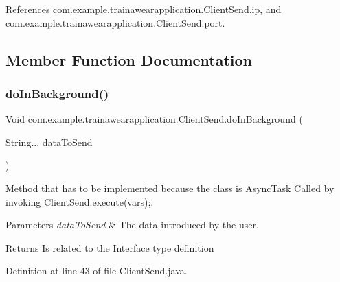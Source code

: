 References com.\+example.\+trainawearapplication.\+Client\+Send.\+ip, and com.\+example.\+trainawearapplication.\+Client\+Send.\+port.



\subsection{Member Function Documentation}
\mbox{\label{classcom_1_1example_1_1trainawearapplication_1_1_client_send_ad8e0bcd2078b23e83c1060065834ae7d}} 
\subsubsection{\texorpdfstring{doInBackground()}{doInBackground()}}
{\footnotesize\ttfamily Void com.\+example.\+trainawearapplication.\+Client\+Send.\+do\+In\+Background (\begin{DoxyParamCaption}\item[{String...}]{data\+To\+Send }\end{DoxyParamCaption})}



Method that has to be implemented because the class is Async\+Task Called by invoking Client\+Send.\+execute(vars);. 


\begin{DoxyParams}{Parameters}
{\em data\+To\+Send} & The data introduced by the user. \\
\hline
\end{DoxyParams}
\begin{DoxyReturn}{Returns}
Is related to the Interface type definition 
\end{DoxyReturn}


Definition at line 43 of file Client\+Send.\+java.


